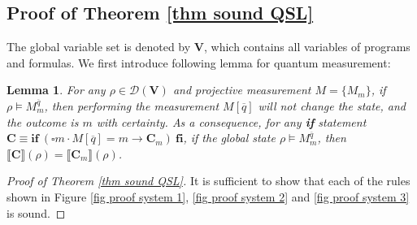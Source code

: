 \documentclass[conference,compsoc, 10pt]{IEEEtran}
\newtheorem{lemma}{Lemma}[section]
\newcommand {\qbar} {{\overline{q}}}
\newcommand {\qU} {{\overline{q}:=U[\overline{q}]}}
\newcommand {\cD } {{\mathcal{D}}}
\newcommand {\rt }[2] {{\left.{#1}\right|_{#2}}}
\newcommand {\vars } {\mathbf{V}}
\newcommand {\var } {\mathsf{var}}
\newcommand {\prog } {{\mathbf{C}}}
\newcommand {\sem}[1] {\llbracket#1\rrbracket}
\begin{document}
\begin{appendices}
		\subsection{Proof of Theorem \ref{thm sound QSL}}
		\label{sec app sub proof thm sound QSL}
		The global variable set is denoted by $\vars$, which contains all variables of programs and formulas. We first introduce following lemma for quantum measurement:	
		\begin{lemma}
			\label{lem sound proof 4}
			For any $\rho\in\cD(\vars)$ and projective measurement $M = \{M_m\}$, if $\rho\models M_m^{\qbar}$, then performing the measurement $M[\qbar]$ will not change the state, and the outcome is $m$ with certainty. As a consequence, for any {\bf if} statement $\prog\equiv\mathbf{if}\ (\square m\cdot M[\qbar] = m \rightarrow \prog_m )\ \mathbf{fi}$, if the global state $\rho\models M_m^{\qbar}$, then $\sem{\prog}(\rho) = \sem{\prog_m}(\rho)$. 
		\end{lemma}
		
		
		\begin{proof}[Proof of Theorem \ref{thm sound QSL}]
			
			It is sufficient to show that each of the rules shown in Figure \ref{fig proof system 1}, \ref{fig proof system 2} and \ref{fig proof system 3} is sound.
			

\end{proof}
\end{appendices}
\end{document}
